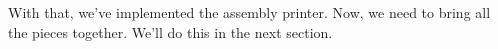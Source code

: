 With that, we’ve implemented the assembly printer. Now, we need to bring all the pieces together. We’ll do this in the next section.



















































